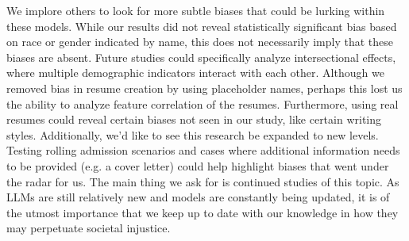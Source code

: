 \documentclass[11pt,letterpaper]{article}
\begin{document}
We implore others to look for more subtle biases that could be lurking within these models. While our results did not reveal statistically significant bias based on race or gender indicated by name, this does not necessarily imply that these biases are absent. Future studies could specifically analyze intersectional effects, where multiple demographic indicators interact with each other. Although we removed bias in resume creation by using placeholder names, perhaps this lost us the ability to analyze feature correlation of the resumes. Furthermore, using real resumes could reveal certain biases not seen in our study, like certain writing styles. Additionally, we'd like to see this research be expanded to new levels. Testing rolling admission scenarios and cases where additional information needs to be provided (e.g. a cover letter) could help highlight biases that went under the radar for us. The main thing we ask for is continued studies of this topic. As LLMs are still relatively new and models are constantly being updated, it is of the utmost importance that we keep up to date with our knowledge in how they may perpetuate societal injustice.






\newpage
 
\end{document}
